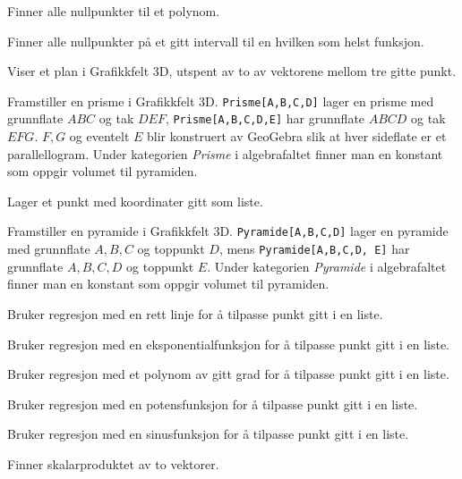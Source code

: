 {Finner alle nullpunkter til et polynom.}

{Finner alle nullpunkter på et gitt intervall til en hvilken som helst funksjon.}

{Viser et plan i Grafikkfelt 3D, utspent av to av vektorene mellom tre gitte punkt.}

{Framstiller en prisme i Grafikkfelt 3D. {\tt Prisme[A,B,C,D]} lager en prisme med grunnflate $ ABC $ og tak $ DEF $, {\tt Prisme[A,B,C,D,E]} har grunnflate $ ABCD $ og tak $ EFG $. $ F, G$ og eventelt $ E $ blir konstruert av GeoGebra slik at hver sideflate er et parallellogram. Under kategorien \textsl{Prisme} i algebrafaltet finner man en konstant som oppgir volumet til pyramiden.}

 {Lager et punkt med koordinater gitt som liste. \\
	
}

{Framstiller en pyramide i Grafikkfelt 3D. {\tt Pyramide[A,B,C,D]} lager en pyramide med grunnflate ${ A, B, C} $ og toppunkt $ D $, mens {\tt Pyramide[A,B,C,D, E]} har grunnflate ${ A, B, C, D }$ og toppunkt $ E $. Under kategorien \textsl{Pyramide} i algebrafaltet finner man en konstant som oppgir volumet til pyramiden.}

{Bruker regresjon med en rett linje for å tilpasse punkt gitt i en liste.}

{Bruker regresjon med en eksponentialfunksjon for å tilpasse punkt gitt i en liste.}

{Bruker regresjon med et polynom av gitt grad for å tilpasse punkt gitt i en liste.}

{Bruker regresjon med en potensfunksjon for å tilpasse punkt gitt i en liste.}

{Bruker regresjon med en sinusfunksjon for å tilpasse punkt gitt i en liste.	}

{Finner skalarproduktet av to vektorer. 
	
	}

